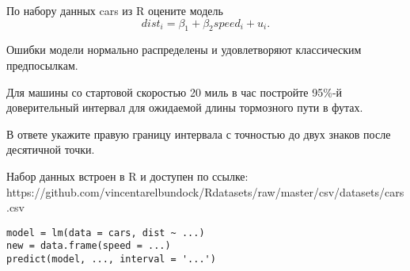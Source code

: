 
\begin{question}
По набору данных cars из R оцените модель
\[
dist_i = \beta_1 + \beta_2 speed_i + u_i.
\]

Ошибки модели нормально распределены и удовлетворяют классическим предпосылкам.

Для машины со стартовой скоростью 20 миль в час постройте 95\%-й доверительный интервал для
ожидаемой длины тормозного пути в футах.

В ответе укажите правую границу интервала с точностью до двух знаков после десятичной точки.

Набор данных встроен в R и доступен по ссылке:
https://github.com/vincentarelbundock/Rdatasets/raw/master/csv/datasets/cars.csv
\end{question}

\begin{solution}
\begin{verbatim}
model = lm(data = cars, dist ~ ...)
new = data.frame(speed = ...)
predict(model, ..., interval = '...')
\end{verbatim}
\end{solution}


